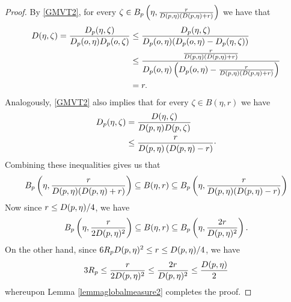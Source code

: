 \begin{proof}
By \eqref{GMVT2}, for every $\zeta\in B_p\left(\eta,\frac{r}{D(p,\eta)(D(p,\eta) + r)}\right)$ we have that
\begin{align*}
D(\eta,\zeta) = \frac{D_p(\eta,\zeta)}{D_p(o,\eta)D_p(o,\zeta)} 
&\leq \frac{D_p(\eta,\zeta)}{D_p(o,\eta)(D_p(o,\eta) - D_p(\eta,\zeta))}\\
&\leq \frac{\frac{r}{D(p,\eta)(D(p,\eta) + r)}}{D_p(o,\eta)\left(D_p(o,\eta) - \frac{r}{D(p,\eta)(D(p,\eta) + r)}\right)}\\ 
&= r. 
\end{align*}
Analogously, \eqref{GMVT2} also implies that for every $\zeta \in B(\eta,r)$ we have 
\begin{align*}
D_p(\eta,\zeta) 
&= \frac{D(\eta,\zeta)}{D(p,\eta)D(p,\zeta)}\\ 
&\leq \frac{r}{D(p,\eta) \left( D(p,\eta) - r \right)} \cdot
\end{align*}
Combining these inequalities gives us that 
\[
B_p\left(\eta,\frac{r}{D(p,\eta)(D(p,\eta) + r)}\right)
\subseteq B(\eta,r)
\subseteq B_p\left(\eta,\frac{r}{D(p,\eta)(D(p,\eta) - r)}\right)
\]
Now since $r\leq D(p,\eta)/4$, we have
\[
B_p\left(\eta,\frac{r}{2D(p,\eta)^2}\right)
\subseteq B(\eta,r)
\subseteq B_p\left(\eta,\frac{2r}{D(p,\eta)^2}\right).
\]
On the other hand, since $6R_p D(p,\eta)^2 \leq r \leq D(p,\eta)/4$, we have
\[
3R_p \leq \frac{r}{2D(p,\eta)^2} \leq \frac{2r}{D(p,\eta)^2} \leq \frac{D(p,\eta)}{2}
\]
whereupon Lemma \ref{lemmaglobalmeasure2} completes the proof.
\end{proof}

